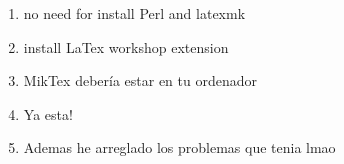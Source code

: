 \documentclass[a4paper,10pt,twoside]{article}
\begin{document}
\begin{enumerate}
    \item no need for install Perl and latexmk
    \item install LaTex workshop extension
    \item MikTex debería estar en tu ordenador
    \item Ya esta!
    \item Ademas he arreglado los problemas que tenia lmao
\end{enumerate}
\end{document}
